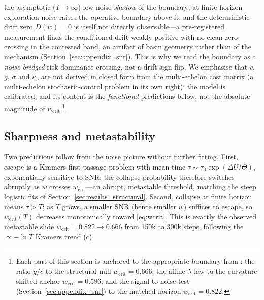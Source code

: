 \documentclass[letterpaper]{article}
\theoremstyle{plain}
\newcommand{\wcrit}{w_{\mathrm{crit}}}
\begin{document}
the asymptotic ($T\!\to\!\infty$) low-noise \emph{shadow} of the boundary; at
finite horizon exploration noise raises the operative boundary above it, and the
deterministic drift zero $D(w){=}0$ is itself not directly observable---a
pre-registered measurement finds the conditioned drift weakly positive with no
clean zero-crossing in the contested band, an artifact of basin geometry rather
than of the mechanism (Section~\ref{sec:appendix_snr}). This is why we read the
boundary as a \emph{noise-bridged} risk-dominance crossing, not a drift-sign
flip. We emphasise that $c$, $g$, $\sigma$ and
$\kappa_c$ are not derived in closed form from the multi-echelon cost
matrix (a multi-echelon stochastic-control problem in its own right); the
model is calibrated, and its content is the \emph{functional} predictions
below, not the absolute magnitude of $\wcrit$.\footnote{%
  Each part of this section is anchored to the appropriate boundary from
  : the ratio $g/c$ to the structural null
  $\wcrit{=}0.666$; the affine $\lambda$-law to the curvature-shifted anchor
  $\wcrit{=}0.586$; and the signal-to-noise test
  (Section~\ref{sec:appendix_snr}) to the matched-horizon $\wcrit{=}0.822$.}

\subsection{Sharpness and metastability}
Two predictions follow from the noise picture without further fitting.
First, escape is a Kramers first-passage problem with mean time
$\tau\sim\tau_0\exp(\Delta U/\Theta)$, exponentially sensitive to
$\mathrm{SNR}$; the collapse probability therefore switches abruptly as $w$
crosses $\wcrit$---an abrupt, metastable threshold, matching the steep logistic
fits of Section~\ref{sec:results_structural}. Second, collapse at finite horizon
means $\tau>T$; as $T$ grows, a smaller $\mathrm{SNR}$ (hence smaller $w$)
suffices to escape, so $\wcrit(T)$ decreases monotonically toward
\eqref{eq:wcrit}. This is exactly the observed metastable slide
$\wcrit=0.822\!\to\!0.666$ from 150k to 300k steps, following the
$\propto-\ln T$ Kramers trend (c).
\end{document}
